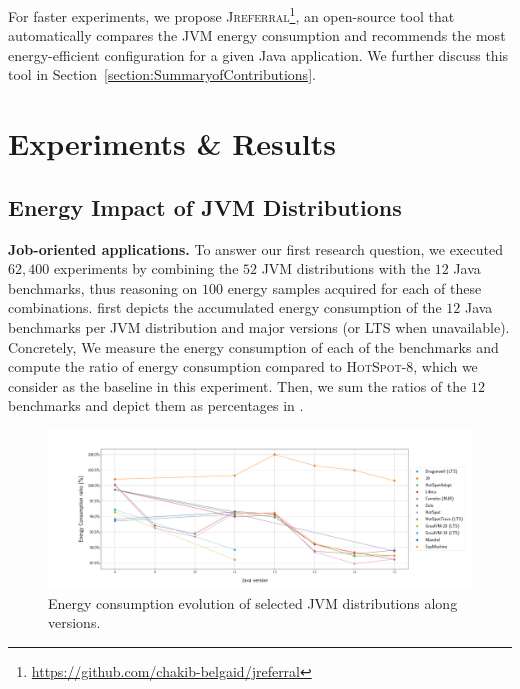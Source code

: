 For faster experiments, we propose \textsc{Jreferral}\footnote{\url{https://github.com/chakib-belgaid/jreferral}}, an open-source tool that automatically compares the JVM energy consumption and recommends the most energy-efficient configuration for a given Java application.
We further discuss this tool in Section~\ref{section:SummaryofContributions}.


\section{Experiments \& Results}\label{sec:exp}
\subsection{Energy Impact of JVM Distributions}
\noindent\textbf{Job-oriented applications.}
To answer our first research question, we executed $62,400$ experiments by combining the $52$ JVM distributions with the $12$ Java benchmarks, thus reasoning on $100$ energy samples acquired for each of these combinations.
 first depicts the accumulated energy consumption of the $12$ Java benchmarks per JVM distribution and major versions (or LTS when unavailable).
Concretely, We measure the energy consumption of each of the benchmarks and compute the ratio of energy consumption compared to \textsc{HotSpot-8}, which we consider as the baseline in this experiment.
Then, we sum the ratios of the $12$ benchmarks and depict them as percentages in .

\begin{figure}%
    \centering
    \includegraphics[width=\linewidth]{imgs/alljvms_chetemi8_baseon8.pdf}
    \caption{Energy consumption evolution of selected JVM distributions along versions.}
    \label{fig:JVMs}
\end{figure}

